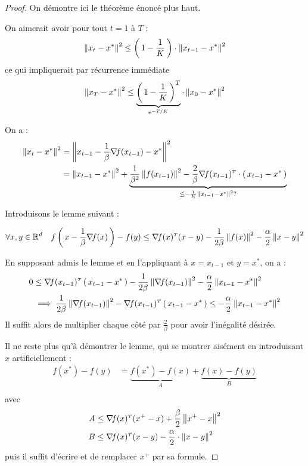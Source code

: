   \begin{proof}
    On démontre ici le théorème énoncé plus haut.

    On aimerait avoir pour tout $t=1$ à $T$ :
    \begin{equation}
      \norme{x_t-x^{*}}^2\leq \prt{1- \frac{1}{K}} \cdot \norme{x_{t-1}-x^{*}}^2
    \end{equation}
    ce qui impliquerait par récurrence immédiate
    \begin{equation}
      \norme{x_T-x^{*}}^2\leq \underbrace{\prt{1- \frac{1}{K}}^T}_{\e^{-T/K}}\cdot \norme{x_{0}-x^{*}}^2
    \end{equation}

    On a :
    \begin{align*}
      \norme{x_t-x^{*}}^2&= \norme{x_{t-1}-\frac{1}{\beta} \nabla\! f(x_{t-1})-x^{*}}^2\\
      &= \norme{x_{t-1}-x^{*}}^2+\underbrace{\frac{1}{\beta^2} \norme{f(x_{t-1})}^2-
      \frac{2}{\beta}\transpose{\nabla\! f(x_{t-1})} \cdot \prt{x_{t-1}-x^{*}}}_{\leq
      -\frac{1}{K}\norme{x_{t-1}-x^{*}}^2?
      }
    \end{align*}

    Introduisons le lemme suivant :
    \begin{lemma}
      \begin{equation}
        \forall x, y \in \R^d \quad f\prt{x-\frac{1}{\beta} \nabla\! f(x)} - f(y)
        \leq \transpose{\nabla\! f(x)} (x-y)-\frac{1}{2 \beta } \norme{f(x)}^2
        - \frac{\alpha}{2} \norme{x-y}^2
      \end{equation}
    \end{lemma}

    En supposant admis le lemme et en l'appliquant à $x = x_{t-1}$ et $y = x^{*}$,
    on a :
    \begin{align*}
0 &\leq \transpose{\nabla\! f(x_{t-1})}\prt{x_{t-1}-x^{*}}
-\frac{1}{2 \beta} \norme{\nabla\! f(x_{t-1})}^2 - \frac{\alpha}{2} \norme{x_{t-1}-x^{*}}^2\\
&\implies \frac{1}{2\beta } \norme{\nabla\! f(x_{t-1})}^2-\transpose{\nabla\! f(x_{t-1})}\prt{x_{t-1}-x^{*}} \leq - \frac{\alpha}{2} \norme{x_{t-1}-x^{*}}^2
    \end{align*}
Il suffit alors de multiplier chaque côté par $\frac{2}{\beta}$ pour avoir l'inégalité désirée.

Il ne reste plus qu'à démontrer le lemme, qui se montrer aisément en introduisant $x$
artificiellement :
\begin{align*}
  f(x^{*})-f(y)&= \underbrace{f(x^{*})-f(x)}_{A}+
  \underbrace{f(x)-f(y)}_{B}\\
  \end{align*}
  avec
  \begin{align*}
    A &\leq \transpose{\nabla\! f(x)}(x^+-x)+ \frac{\beta}{2} \norme{x^+-x}^2\\
    B &\leq \transpose{\nabla\! f(x)}(x-y)-\frac{\alpha}{2} \cdot \norme{x-y}^2
  \end{align*}
  puis il suffit d'écrire et de remplacer $x^+$ par sa formule.

  \end{proof}
